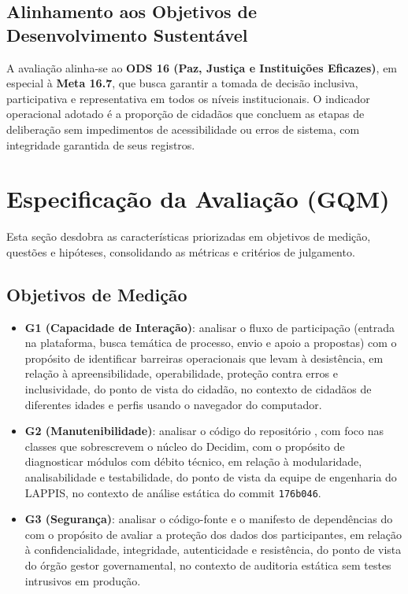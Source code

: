 \documentclass[journal]{IEEEtran}
\begin{document}
\subsection{Alinhamento aos Objetivos de Desenvolvimento Sustentável}
\label{sec:ods}

A avaliação alinha-se ao \textbf{ODS 16 (Paz, Justiça e Instituições Eficazes)}, em especial à \textbf{Meta 16.7}, que busca garantir a tomada de decisão inclusiva, participativa e representativa em todos os níveis institucionais. O indicador operacional adotado é a proporção de cidadãos que concluem as etapas de deliberação sem impedimentos de acessibilidade ou erros de sistema, com integridade garantida de seus registros.

\section{Especificação da Avaliação (GQM)}
\label{sec:fase2}

Esta seção desdobra as características priorizadas em objetivos de medição, questões e hipóteses, consolidando as métricas e critérios de julgamento.

\subsection{Objetivos de Medição}
\label{sec:objetivos}

\begin{itemize}
    \item \textbf{G1 (Capacidade de Interação)}: analisar o fluxo de participação (entrada na plataforma, busca temática de processo, envio e apoio a propostas) com o propósito de identificar barreiras operacionais que levam à desistência, em relação à apreensibilidade, operabilidade, proteção contra erros e inclusividade, do ponto de vista do cidadão, no contexto de cidadãos de diferentes idades e perfis usando o navegador do computador.
    \item \textbf{G2 (Manutenibilidade)}: analisar o código do repositório , com foco nas classes que sobrescrevem o núcleo do Decidim, com o propósito de diagnosticar módulos com débito técnico, em relação à modularidade, analisabilidade e testabilidade, do ponto de vista da equipe de engenharia do LAPPIS, no contexto de análise estática do commit \texttt{176b046}.
    \item \textbf{G3 (Segurança)}: analisar o código-fonte e o manifesto de dependências do  com o propósito de avaliar a proteção dos dados dos participantes, em relação à confidencialidade, integridade, autenticidade e resistência, do ponto de vista do órgão gestor governamental, no contexto de auditoria estática sem testes intrusivos em produção.
\end{itemize}
\end{document}
